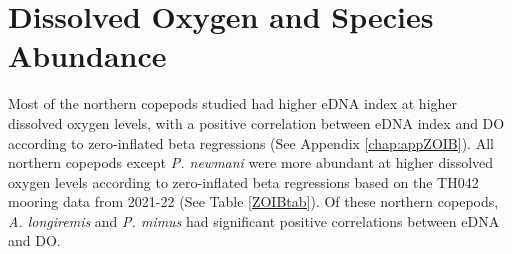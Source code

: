 \documentclass[12pt,twoside]{reedthesis}
\begin{document}
	
	
	\section{Dissolved Oxygen and Species Abundance}  
	
	Most of the northern copepods studied had higher eDNA index at higher dissolved oxygen levels, with a positive correlation between eDNA index and DO according to zero-inflated beta regressions (See Appendix \ref{chap:appZOIB}). All northern copepods except \textit{P. newmani} were more abundant at higher dissolved oxygen levels according to zero-inflated beta regressions based on the TH042 mooring data from 2021-22 (See Table \ref{ZOIBtab}). Of these northern copepods, \textit{A. longiremis} and \textit{P. mimus} had significant positive correlations between eDNA and DO. 
	
\end{document}
